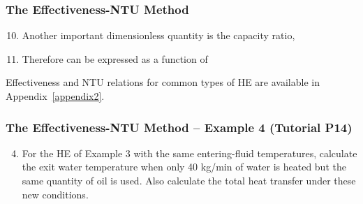 \documentclass[10pt,compress,unknownkeysallowed]{beamer}
\begin{document}
\begin{frame}
  \frametitle{The Effectiveness-NTU Method}
     \begin{enumerate}\setcounter{enumi}{9}
          \item<1-> Another important dimensionless quantity is the capacity ratio,
          \item<2-> Therefore  can be expressed as a function of
         
     \end{enumerate}
 
     Effectiveness and NTU relations for common types of HE are available in Appendix~\ref{appendix2}.

\end{frame}

\begin{frame}
  \frametitle{ The Effectiveness-NTU Method -- Example 4 (Tutorial P14)}
      \begin{enumerate}\setcounter{enumi}{3}
         \item For the HE of Example 3 with the same entering-fluid temperatures, calculate the exit water temperature when only 40 kg/min of water is heated but the same quantity of oil is used. Also calculate the total heat transfer under these new conditions.
      \end{enumerate}
\end{frame}
\end{document}
